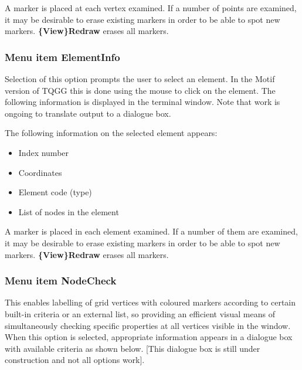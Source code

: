 \documentclass{article}
\begin{document}
A marker is placed at each vertex examined. If a number of points are examined, it may be desirable to erase existing markers in order to be able to spot new markers. \textbf{\{View\}Redraw} erases all markers.


\subsubsection{Menu item ElementInfo}
Selection of this option prompts the user to select an element.  In the Motif version of TQGG this is done using the mouse to click on the element.  The following information is displayed in the terminal window.  Note that work is ongoing to translate output to a dialogue box.

The following information on the selected element appears:

\begin{itemize}
\item Index number
\item Coordinates
\item Element code (type)
\item List of nodes in the element 
\end{itemize}
A marker is placed in each element examined. If a number of them are examined, it may be desirable to erase existing markers in order to be able to spot new markers. \textbf{\{View\}Redraw} erases all markers.


\subsubsection{Menu item NodeCheck}
This enables labelling of grid vertices with coloured markers according to certain built-in criteria or an external list, so providing an efficient visual means of simultaneously checking specific properties at all vertices visible in the window. When this option is selected, appropriate information appears in a dialogue box with available criteria as shown below. [This dialogue box is still under construction and not all options work].
\\ \\
\end{document}
